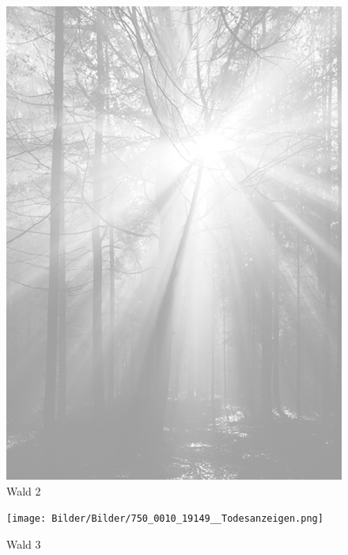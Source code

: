 \documentclass[ngerman,a4paper,11pt]{scrreprt}
\begin{document}
\begin{figure}[H]
\centering
\includegraphics[width=\textwidth,height=.8\textheight,keepaspectratio]{Bilder/Bilder/750_0010_16157_1122849_Hintergrund_mit_Wald_und_Sonne_1.png}
\caption{\label{img_Wald_2}Wald 2}
\end{figure}

\begin{figure}[H]
\centering
\texttt{[image: Bilder/Bilder/750\_0010\_19149\_\_Todesanzeigen.png]}
\caption{\label{img_Wald_3}Wald 3}
\end{figure}
\end{document}
